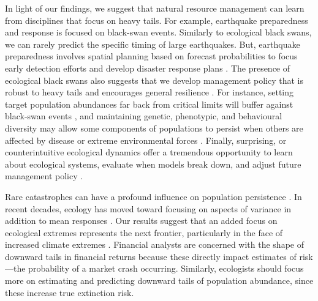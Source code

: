 \documentclass[9pt,twocolumn,twoside]{pnas-new}
\begin{document}
In light of our findings, we suggest that natural resource management can
learn from disciplines that focus on heavy tails. For example, earthquake
preparedness and response is focused on black-swan events. Similarly to
ecological black swans, we can rarely predict the specific timing of large
earthquakes. But, earthquake preparedness involves spatial planning based on
forecast probabilities to focus early detection efforts and develop disaster
response plans \cite{nrc2007}. The presence of ecological black swans also suggests that we
develop management policy that is robust to heavy tails and encourages
general resilience \cite{carpenter2012}. For instance, setting target
population abundances far back from critical limits will buffer against black-swan
events \cite{caddy1996}, and maintaining genetic, phenotypic, and behavioural
diversity may allow some components of populations to persist when others are
affected by disease or extreme environmental forces \cite{schindler2010}.
Finally, surprising, or counterintuitive ecological dynamics offer a tremendous
opportunity to learn about ecological systems, evaluate when models break down,
and adjust future management policy \cite{doak2008, lindenmayer2010}.

Rare catastrophes can have a profound influence on population
persistence \cite{mangel1994}. In recent decades, ecology has moved toward
focusing on aspects of variance in addition to mean
responses \cite{thompson2013}. Our results suggest that an added focus on
ecological extremes represents the next frontier, particularly in the face of
increased climate extremes \cite{meehl2004, ipcc2012, thompson2013}. Financial
analysts are concerned with the shape of downward tails in financial returns
because these directly impact estimates of risk---the probability of a
market crash occurring.
Similarly, ecologists should focus more
on estimating and predicting downward tails of population abundance, since
these increase true extinction risk.
\end{document}
